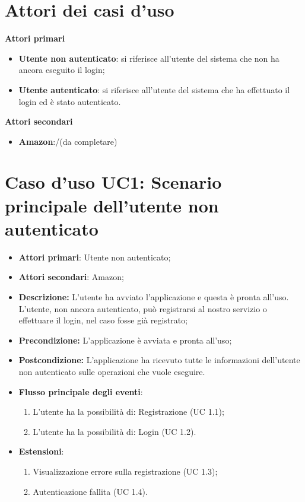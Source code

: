 \section{Attori dei casi d'uso}
\textbf{Attori primari}
	\begin{itemize}
	\item \textbf{Utente non autenticato}: si riferisce all'utente del sistema che non ha ancora eseguito il login;
	\item \textbf{Utente autenticato}: si riferisce all'utente del sistema che ha effettuato il login ed è stato autenticato.
	\end{itemize}
\textbf{Attori secondari}
	\begin{itemize}
	\item \textbf{Amazon}:/(da completare)
\end{itemize}





\section{Caso d'uso UC1: Scenario principale dell'utente non autenticato}
\begin{itemize}
	\item \textbf{Attori primari}: Utente non autenticato;
	\item \textbf{Attori secondari}: Amazon;
	\item \textbf{Descrizione:} L'utente ha avviato l'applicazione e questa è pronta all'uso. L'utente, non ancora autenticato, può registrarsi al nostro servizio o effettuare il login, nel caso fosse già registrato;
	\item \textbf{Precondizione:} L'applicazione è avviata e pronta all'uso;
	\item \textbf{Postcondizione:} L'applicazione ha ricevuto tutte le informazioni dell'utente non autenticato sulle operazioni che vuole eseguire.
	\item \textbf{Flusso principale degli eventi}:
		\begin{enumerate}
			\item L'utente ha la possibilità di: Registrazione (UC 1.1);
			\item L'utente ha la possibilità di: Login (UC 1.2).
		\end{enumerate}
	\item \textbf{Estensioni}:
		\begin{enumerate}
			\item Visualizzazione errore sulla registrazione (UC 1.3);
			\item Autenticazione fallita (UC 1.4).
		\end{enumerate}
\end{itemize}

